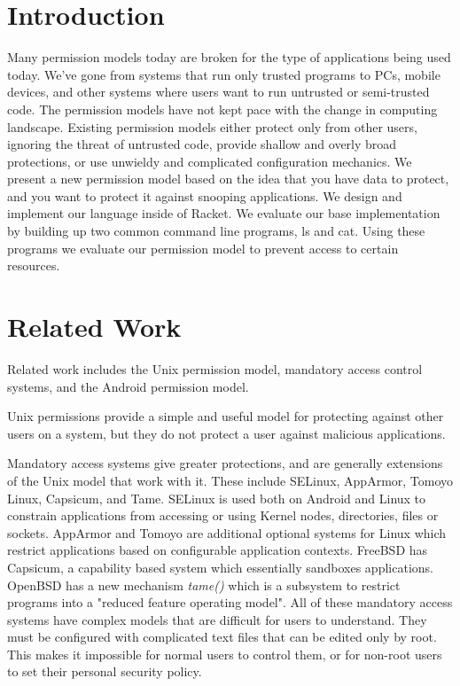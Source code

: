 \section{Introduction}\label{section:Introduction}
Many permission models today are broken for the type of applications being used today. We've gone from systems that run only trusted programs to PCs, mobile devices, and other systems where users want to run untrusted or semi-trusted code. The permission models have not kept pace with the change in computing landscape. Existing permission models either protect only from other users, ignoring the threat of untrusted code, provide shallow and overly broad protections, or use unwieldy and complicated configuration mechanics. We present a new permission model based on the idea that you have data to protect, and you want to protect it against snooping applications. We design and implement our language inside of Racket\cite{racket}. We evaluate our base implementation by building up two common command line programs, ls and cat. Using these programs we evaluate our permission model to prevent access to certain resources.

\section{Related Work}\label{section:relatedwork}
Related work includes the Unix permission model, mandatory access control systems, and the Android permission model.

Unix permissions provide a simple and useful model for protecting against other users on a system, but they do not protect a user against malicious applications.

Mandatory access systems give greater protections, and are generally extensions of the Unix model that work with it.  These include SELinux, AppArmor, Tomoyo Linux, Capsicum, and Tame.
SELinux\cite{selinux} is used both on Android and Linux to constrain applications from accessing or using Kernel nodes, directories, files or sockets. 
AppArmor and Tomoyo are additional optional systems for Linux which restrict applications based on configurable application contexts.
FreeBSD has Capsicum\cite{capsicum}, a capability based system which essentially sandboxes applications. 
OpenBSD has a new mechanism \textit{tame()}\cite{tame} which is a subsystem  to restrict programs into a "reduced feature operating model".
All of these mandatory access systems have complex models that are difficult for users to understand.  
They must be configured with complicated text files that can be edited only by root.  
This makes it impossible for normal users to control them, or for non-root users to set their personal security policy.

